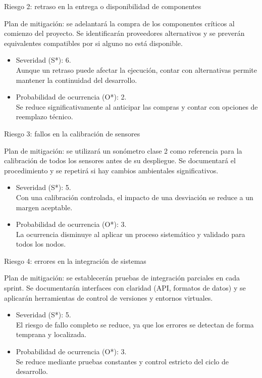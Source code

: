 \documentclass[
11pt, %
]{charter}
\begin{document}
Riesgo 2: retraso en la entrega o disponibilidad de componentes

Plan de mitigación: se adelantará la compra de los componentes críticos al comienzo del proyecto. Se identificarán proveedores alternativos y se preverán equivalentes compatibles por si alguno no está disponible.

\begin{itemize}
	\item Severidad (S*): 6.\\
	Aunque un retraso puede afectar la ejecución, contar con alternativas permite mantener la continuidad del desarrollo.
	\item Probabilidad de ocurrencia (O*): 2.\\
	Se reduce significativamente al anticipar las compras y contar con opciones de reemplazo técnico.
\end{itemize}

Riesgo 3: fallos en la calibración de sensores

Plan de mitigación: se utilizará un sonómetro clase 2 como referencia para la calibración de todos los sensores antes de su despliegue. Se documentará el procedimiento y se repetirá si hay cambios ambientales significativos.

\begin{itemize}
	\item Severidad (S*): 5.\\
	Con una calibración controlada, el impacto de una desviación se reduce a un margen aceptable.
	\item Probabilidad de ocurrencia (O*): 3.\\
	La ocurrencia disminuye al aplicar un proceso sistemático y validado para todos los nodos.
\end{itemize}

Riesgo 4: errores en la integración de sistemas

Plan de mitigación: se establecerán pruebas de integración parciales en cada sprint. Se documentarán interfaces con claridad (API, formatos de datos) y se aplicarán herramientas de control de versiones y entornos virtuales.

\begin{itemize}
	\item Severidad (S*): 5.\\
	El riesgo de fallo completo se reduce, ya que los errores se detectan de forma temprana y localizada.
	\item Probabilidad de ocurrencia (O*): 3.\\
	Se reduce mediante pruebas constantes y control estricto del ciclo de desarrollo.
\end{itemize}
\end{document}
